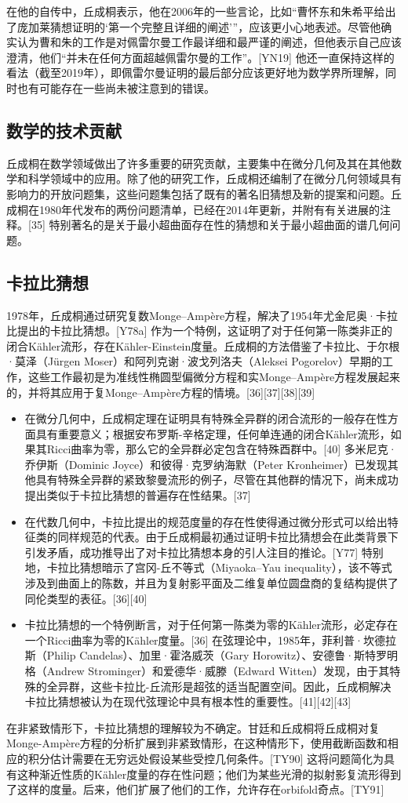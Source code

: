 在他的自传中，丘成桐表示，他在2006年的一些言论，比如“曹怀东和朱希平给出了庞加莱猜想证明的‘第一个完整且详细的阐述’”，应该更小心地表述。尽管他确实认为曹和朱的工作是对佩雷尔曼工作最详细和最严谨的阐述，但他表示自己应该澄清，他们“并未在任何方面超越佩雷尔曼的工作”。[YN19] 他还一直保持这样的看法（截至2019年），即佩雷尔曼证明的最后部分应该更好地为数学界所理解，同时也有可能存在一些尚未被注意到的错误。
\subsection{数学的技术贡献}
丘成桐在数学领域做出了许多重要的研究贡献，主要集中在微分几何及其在其他数学和科学领域中的应用。除了他的研究工作，丘成桐还编制了在微分几何领域具有影响力的开放问题集，这些问题集包括了既有的著名旧猜想及新的提案和问题。丘成桐在1980年代发布的两份问题清单，已经在2014年更新，并附有有关进展的注释。[35] 特别著名的是关于最小超曲面存在性的猜想和关于最小超曲面的谱几何问题。
\subsection{卡拉比猜想} 
1978年，丘成桐通过研究复数Monge–Ampère方程，解决了1954年尤金尼奥·卡拉比提出的卡拉比猜想。[Y78a] 作为一个特例，这证明了对于任何第一陈类非正的闭合Kähler流形，存在Kähler-Einstein度量。丘成桐的方法借鉴了卡拉比、于尔根·莫泽（Jürgen Moser）和阿列克谢·波戈列洛夫（Aleksei Pogorelov）早期的工作，这些工作最初是为准线性椭圆型偏微分方程和实Monge–Ampère方程发展起来的，并将其应用于复Monge–Ampère方程的情境。[36][37][38][39]
\begin{itemize}
\item 在微分几何中，丘成桐定理在证明具有特殊全异群的闭合流形的一般存在性方面具有重要意义；根据安布罗斯-辛格定理，任何单连通的闭合Kähler流形，如果其Ricci曲率为零，那么它的全异群必定包含在特殊酉群中。[40] 多米尼克·乔伊斯（Dominic Joyce）和彼得·克罗纳海默（Peter Kronheimer）已发现其他具有特殊全异群的紧致黎曼流形的例子，尽管在其他群的情况下，尚未成功提出类似于卡拉比猜想的普遍存在性结果。[37]  
\item 在代数几何中，卡拉比提出的规范度量的存在性使得通过微分形式可以给出特征类的同样规范的代表。由于丘成桐最初通过证明卡拉比猜想会在此类背景下引发矛盾，成功推导出了对卡拉比猜想本身的引人注目的推论。[Y77] 特别地，卡拉比猜想暗示了宫冈-丘不等式（Miyaoka–Yau inequality），该不等式涉及到曲面上的陈数，并且为复射影平面及二维复单位圆盘商的复结构提供了同伦类型的表征。[36][40]  
\item 卡拉比猜想的一个特例断言，对于任何第一陈类为零的Kähler流形，必定存在一个Ricci曲率为零的Kähler度量。[36] 在弦理论中，1985年，菲利普·坎德拉斯（Philip Candelas）、加里·霍洛威茨（Gary Horowitz）、安德鲁·斯特罗明格（Andrew Strominger）和爱德华·威滕（Edward Witten）发现，由于其特殊的全异群，这些卡拉比-丘流形是超弦的适当配置空间。因此，丘成桐解决卡拉比猜想被认为在现代弦理论中具有根本性的重要性。[41][42][43]
\end{itemize}
在非紧致情形下，卡拉比猜想的理解较为不确定。甘廷和丘成桐将丘成桐对复Monge-Ampère方程的分析扩展到非紧致情形，在这种情形下，使用截断函数和相应的积分估计需要在无穷远处假设某些受控几何条件。[TY90] 这将问题简化为具有这种渐近性质的Kähler度量的存在性问题；他们为某些光滑的拟射影复流形得到了这样的度量。后来，他们扩展了他们的工作，允许存在orbifold奇点。[TY91]  

